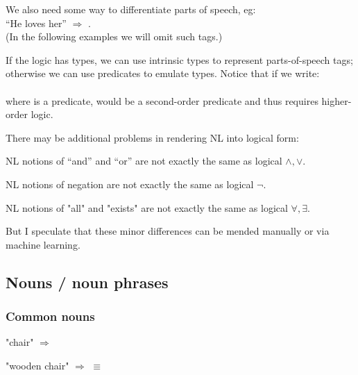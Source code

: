 We also need some way to differentiate parts of speech, eg:\\
\hspace*{1cm} ``He loves her'' $\Longrightarrow$ .\\
(In the following examples we will omit such tags.)

If the logic has types, we can use intrinsic types to represent parts-of-speech tags; otherwise we can use predicates to emulate types.  Notice that if we write:\\
\hspace*{1cm} \\
where  is a predicate,  would be a second-order predicate and thus requires higher-order logic.


There may be additional problems in rendering NL into logical form:
\begin{compactenum}[\textbullet ]
\item NL notions of ``and'' and ``or'' are not exactly the same as logical $\wedge, \vee$.
\item NL notions of negation are not exactly the same as logical $\neg$.
\item NL notions of "all" and "exists" are not exactly the same as logical $\forall, \exists$.
\end{compactenum}
But I speculate that these minor differences can be mended manually or via machine learning.

\subsection{Nouns / noun phrases}


\subsubsection{Common nouns}

"chair" $\Longrightarrow$ 

"wooden chair" $\Longrightarrow$  $\equiv$ 

